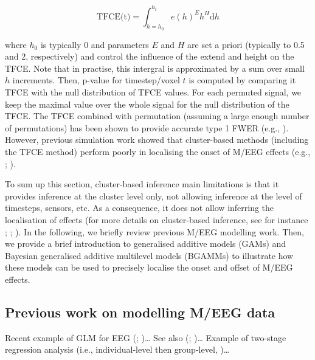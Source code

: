 \documentclass[
  man,
  floatsintext,
  longtable,
  a4paper,
  nolmodern,
  notxfonts,
  notimes,
  colorlinks=true,linkcolor=blue,citecolor=blue,urlcolor=blue]{apa7}
\begin{document}
\[
\text{TFCE(t)} = \int_{h=h_{0}}^{h_{t}} e(h)^{E} h^{H} \mathrm{d}h
\]

where \(h_{0}\) is typically \(0\) and parameters \(E\) and \(H\) are
set a priori (typically to 0.5 and 2, respectively) and control the
influence of the extend and height on the TFCE. Note that in practise,
this intergral is approximated by a sum over small \(h\) increments.
Then, p-value for timestep/voxel \(t\) is computed by comparing it TFCE
with the null distribution of TFCE values. For each permuted signal, we
keep the maximal value over the whole signal for the null distribution
of the TFCE. The TFCE combined with permutation (assuming a large enough
number of permutations) has been shown to provide accurate type 1 FWER
(e.g., ). However,
previous simulation work showed that cluster-based methods (including
the TFCE method) perform poorly in localising the onset of M/EEG effects
(e.g., ;
).

To sum up this section, cluster-based inference main limitations is that
it provides inference at the cluster level only, not allowing inference
at the level of timesteps, sensors, etc. As a consequence, it does not
allow inferring the localisation of effects (for more details on
cluster-based inference, see for instance
; ; ). In the following, we briefly review previous M/EEG
modelling work. Then, we provide a brief introduction to generalised
additive models (GAMs) and Bayesian generalised additive multilevel
models (BGAMMs) to illustrate how these models can be used to precisely
localise the onset and offset of M/EEG effects.

\subsection{Previous work on modelling M/EEG
data}\label{previous-work-on-modelling-meeg-data}

Recent example of GLM for EEG (; )\ldots{} See also (;
)\ldots{} Example of
two-stage regression analysis (i.e., individual-level then group-level,
)\ldots{}
\end{document}
